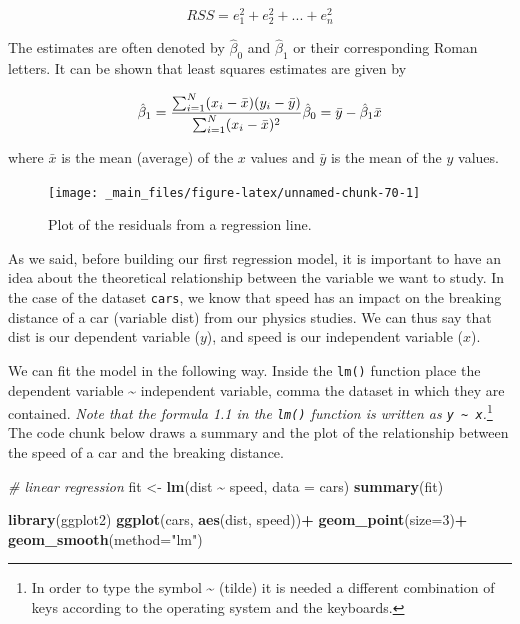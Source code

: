 \documentclass[
]{svmono}
\newenvironment{Shaded}{\begin{snugshade}}{\end{snugshade}}
\newcommand{\AttributeTok}[1]{\textcolor[rgb]{0.13,0.29,0.53}{#1}}
\newcommand{\CommentTok}[1]{\textcolor[rgb]{0.56,0.35,0.01}{\textit{#1}}}
\newcommand{\DecValTok}[1]{\textcolor[rgb]{0.00,0.00,0.81}{#1}}
\newcommand{\FunctionTok}[1]{\textcolor[rgb]{0.13,0.29,0.53}{\textbf{#1}}}
\newcommand{\NormalTok}[1]{#1}
\newcommand{\OtherTok}[1]{\textcolor[rgb]{0.56,0.35,0.01}{#1}}
\newcommand{\SpecialCharTok}[1]{\textcolor[rgb]{0.81,0.36,0.00}{\textbf{#1}}}
\newcommand{\StringTok}[1]{\textcolor[rgb]{0.31,0.60,0.02}{#1}}
\begin{document}
\begin{equation}
RSS=e_1^2+e_2^2+...+e_n^2
\label{eq:rss}
\end{equation}

The estimates are often denoted by \(\hat\beta_0\) and \(\hat\beta_1\) or
their corresponding Roman letters. It can be shown that least squares
estimates are given by

\begin{equation}
\hat\beta_1=\frac{\sum_{i=1}^N(x_i-\bar{x})(y_i-\bar{y})}{\sum_{i=1}^N(x_i-\bar{x})^2} \\
\hat\beta_0=\bar{y}-\hat\beta_1 \bar{x}
\end{equation}

where \(\bar{x}\) is the mean (average) of the \(x\) values and \(\bar{y}\)
is the mean of the \(y\) values.

\begin{figure}[H]

{\centering \texttt{[image: \_main\_files/figure-latex/unnamed-chunk-70-1]} 

}

\caption{Plot of the residuals from a regression line.}\label{fig:unnamed-chunk-70}
\end{figure}

As we said, before building our first regression model, it is important
to have an idea about the theoretical relationship between the variable
we want to study. In the case of the dataset \texttt{cars}, we know that speed
has an impact on the breaking distance of a car (variable dist) from our
physics studies. We can thus say that dist is our dependent variable
(\(y\)), and speed is our independent variable (\(x\)).

We can fit the model in the following way. Inside the \texttt{lm()} function
place the dependent variable \textasciitilde{} independent variable, comma the dataset
in which they are contained. \emph{Note that the formula 1.1 in the \texttt{lm()}
function is written as \texttt{y\ \textasciitilde{}\ x}.}\footnote{In order to type the symbol \textasciitilde{} (tilde) it is needed a different
  combination of keys according to the operating system and the
  keyboards.} The code chunk below draws a
summary and the plot of the relationship between the speed of a car and
the breaking distance.

\begin{Shaded}
\begin{Highlighting}[]
\CommentTok{\# linear regression}
\NormalTok{fit }\OtherTok{\textless{}{-}} \FunctionTok{lm}\NormalTok{(dist }\SpecialCharTok{\textasciitilde{}}\NormalTok{ speed, }\AttributeTok{data =}\NormalTok{ cars)}
\FunctionTok{summary}\NormalTok{(fit)}

\FunctionTok{library}\NormalTok{(ggplot2)}
\FunctionTok{ggplot}\NormalTok{(cars, }\FunctionTok{aes}\NormalTok{(dist, speed))}\SpecialCharTok{+}
        \FunctionTok{geom\_point}\NormalTok{(}\AttributeTok{size=}\DecValTok{3}\NormalTok{)}\SpecialCharTok{+}
        \FunctionTok{geom\_smooth}\NormalTok{(}\AttributeTok{method=}\StringTok{"lm"}\NormalTok{)}
\end{Highlighting}
\end{Shaded}
\end{document}
